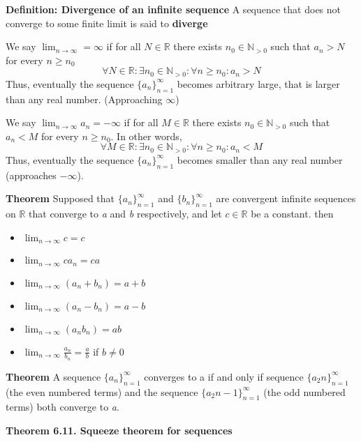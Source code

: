 \documentclass{article}
\newcommand*{\N}{\mathbb{N}}
\newcommand*{\R}{\mathbb{R}}
\begin{document}
\textbf{Definition: Divergence of an infinite sequence}
A sequence that does not converge to some finite limit is said to \textbf{diverge}

We say \(\lim_{n \to \infty} = \infty\) if for all \(N \in \R\) there exists \(n_0 \in \N_{>0}\) such that \(a_n > N\) for every \(n\geq n_0\)
\begin{equation}
    \forall N \in \R:\exists n_0 \in \N_{>0}:\forall n \geq n_0: a_n > N
\end{equation}
Thus, eventually the sequence \(\{a_n\}^{\infty}_{n=1}\) becomes arbitrary large, that is larger than any real number. (Approaching \(\infty\))

We say \(\lim_{n\to \infty}a_n = -\infty\) if for all \(M \in \R\) there exists \(n_0 \in \N_{>0}\) such that \(a_n < M\) for every \(n \geq n_0\). In other words,
\begin{equation}
    \forall M \in \R:\exists n_0 \in \N_{>0}:\forall n \geq n_0: a_n < M
\end{equation}
Thus, eventually the sequence \(\{a_n\}^{\infty}_{n=1}\) becomes smaller than any real number (approaches \(-\infty\)).

\vspace{\baselineskip}
\textbf{Theorem} Supposed that \(\{a_n\}^{\infty}_{n=1}\) and \(\{b_n\}^{\infty}_{n=1}\) are convergent infinite sequences on \(\R\) that converge to \textit{a} and \textit{b} respectively, and let \(c \in \R\) be a constant. then
\begin{itemize}
    \item \(\lim_{n\to \infty}c=c\)
    \item \(\lim_{n \to \infty}ca_n = ca\)
    \item \(\lim_{n \to \infty}(a_n + b_n) = a+b\)
    \item \(\lim_{n \to \infty}(a_n - b_n) = a-b\)
    \item \(\lim_{n \to \infty}(a_nb_n) = ab\)
    \item \(\lim_{n \to \infty}\frac{a_n}{b_n} = \frac{a}{b}\) if \(b \neq 0\)
\end{itemize}

\textbf{Theorem} A sequence \(\{a_n\}^{\infty}_{n=1}\) converges to a if and only if sequence \(\{a_2n\}^{\infty}_{n=1}\) (the even numbered terms) and the sequence \(\{a_2n-1\}^{\infty}_{n=1}\) (the odd numbered terms) both converge to \textit{a}.

\vspace{\baselineskip}
\textbf{Theorem 6.11. Squeeze theorem for sequences}
\end{document}
